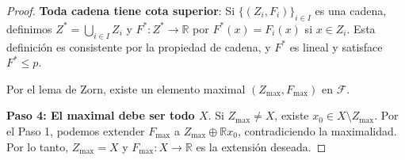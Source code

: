 \documentclass[11pt,a4paper]{article}
\theoremstyle{plain}
\theoremstyle{definition}
\begin{document}
\begin{proof}
\textbf{Toda cadena tiene cota superior}: Si $\{(Z_i, F_i)\}_{i \in I}$ es una cadena, definimos $Z^* = \bigcup_{i \in I} Z_i$ y $F^*: Z^* \to \mathbb{R}$ por $F^*(x) = F_i(x)$ si $x \in Z_i$. Esta definición es consistente por la propiedad de cadena, y $F^*$ es lineal y satisface $F^* \leq p$.

Por el lema de Zorn, existe un elemento maximal $(Z_{\max}, F_{\max})$ en $\mathcal{F}$.

\textbf{Paso 4: El maximal debe ser todo $X$}. Si $Z_{\max} \neq X$, existe $x_0 \in X \setminus Z_{\max}$. Por el Paso 1, podemos extender $F_{\max}$ a $Z_{\max} \oplus \mathbb{R} x_0$, contradiciendo la maximalidad. Por lo tanto, $Z_{\max} = X$ y $F_{\max}: X \to \mathbb{R}$ es la extensión deseada.
\end{proof}
\end{document}
